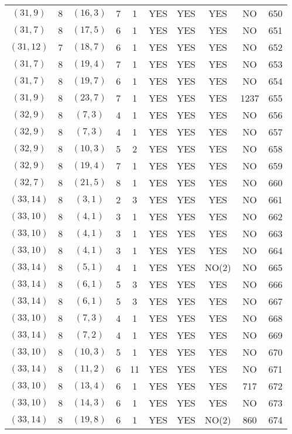 \begin{longtable}{|c|c|c|c|c|c|c|c|c|c|}
$(31, 9)$ & 8 & $(16, 3)$ & 7 & 1 & YES & YES & YES & NO & 650\\
$(31, 7)$ & 8 & $(17, 5)$ & 6 & 1 & YES & YES & YES & NO & 651\\
$(31, 12)$ & 7 & $(18, 7)$ & 6 & 1 & YES & YES & YES & NO & 652\\
$(31, 7)$ & 8 & $(19, 4)$ & 7 & 1 & YES & YES & YES & NO & 653\\
$(31, 7)$ & 8 & $(19, 7)$ & 6 & 1 & YES & YES & YES & NO & 654\\
$(31, 9)$ & 8 & $(23, 7)$ & 7 & 1 & YES & YES & YES & 1237 & 655\\
$(32, 9)$ & 8 & $(7, 3)$ & 4 & 1 & YES & YES & YES & NO & 656\\
$(32, 9)$ & 8 & $(7, 3)$ & 4 & 1 & YES & YES & YES & NO & 657\\
$(32, 9)$ & 8 & $(10, 3)$ & 5 & 2 & YES & YES & YES & NO & 658\\
$(32, 9)$ & 8 & $(19, 4)$ & 7 & 1 & YES & YES & YES & NO & 659\\
$(32, 7)$ & 8 & $(21, 5)$ & 8 & 1 & YES & YES & YES & NO & 660\\
$(33, 14)$ & 8 & $(3, 1)$ & 2 & 3 & YES & YES & YES & NO & 661\\
$(33, 10)$ & 8 & $(4, 1)$ & 3 & 1 & YES & YES & YES & NO & 662\\
$(33, 10)$ & 8 & $(4, 1)$ & 3 & 1 & YES & YES & YES & NO & 663\\
$(33, 10)$ & 8 & $(4, 1)$ & 3 & 1 & YES & YES & YES & NO & 664\\
$(33, 14)$ & 8 & $(5, 1)$ & 4 & 1 & YES & YES & NO(2) & NO & 665\\
$(33, 14)$ & 8 & $(6, 1)$ & 5 & 3 & YES & YES & YES & NO & 666\\
$(33, 14)$ & 8 & $(6, 1)$ & 5 & 3 & YES & YES & YES & NO & 667\\
$(33, 10)$ & 8 & $(7, 3)$ & 4 & 1 & YES & YES & YES & NO & 668\\
$(33, 14)$ & 8 & $(7, 2)$ & 4 & 1 & YES & YES & YES & NO & 669\\
$(33, 10)$ & 8 & $(10, 3)$ & 5 & 1 & YES & YES & YES & NO & 670\\
$(33, 14)$ & 8 & $(11, 2)$ & 6 & 11 & YES & YES & YES & NO & 671\\
$(33, 10)$ & 8 & $(13, 4)$ & 6 & 1 & YES & YES & YES & 717 & 672\\
$(33, 10)$ & 8 & $(14, 3)$ & 6 & 1 & YES & YES & YES & NO & 673\\
$(33, 14)$ & 8 & $(19, 8)$ & 6 & 1 & YES & YES & NO(2) & 860 & 674\\

\end{longtable}
